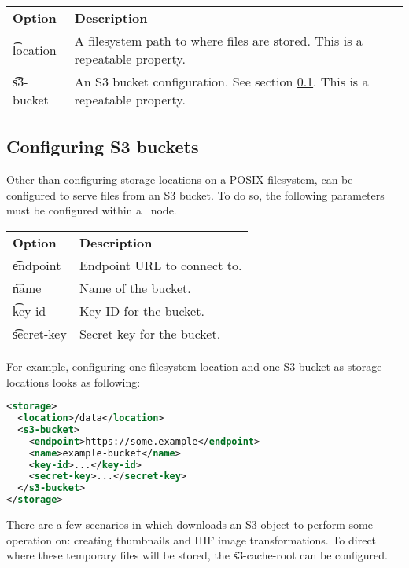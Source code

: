 \begin{tabularx}{\textwidth}{*{1}{!{\VRule[-1pt]}l}!{\VRule[-1pt]}X}
  \headrow
  \textbf{Option}            & \textbf{Description}\\
  \t{location}               & A filesystem path to where files are stored.
                               This is a repeatable property.\\
  \t{s3-bucket}              & An S3 bucket configuration. See section
                               \ref{sec:s3-buckets}. This is a repeatable
                               property.
\end{tabularx}

\subsection{Configuring S3 buckets}
\label{sec:s3-buckets}

  Other than configuring storage locations on a POSIX filesystem,
   can be configured to serve files from an S3 bucket.
  To do so, the following parameters must be configured within a\
   node.

\begin{tabularx}{\textwidth}{*{1}{!{\VRule[-1pt]}l}!{\VRule[-1pt]}X}
  \headrow
  \textbf{Option}             & \textbf{Description}\\
  \t{endpoint}                & Endpoint URL to connect to.\\
  \t{name}                    & Name of the bucket.\\
  \t{key-id}                  & Key ID for the bucket.\\
  \t{secret-key}              & Secret key for the bucket.
\end{tabularx}

  For example, configuring one filesystem location and one S3 bucket
  as storage locations looks as following:

\begin{lstlisting}[language=xml]
<storage>
  <location>/data</location>
  <s3-bucket>
    <endpoint>https://some.example</endpoint>
    <name>example-bucket</name>
    <key-id>...</key-id>
    <secret-key>...</secret-key>
  </s3-bucket>
</storage>
\end{lstlisting}

  There are a few scenarios in which  downloads an S3 object
  to perform some operation on: creating thumbnails and IIIF image
  transformations.  To direct where these temporary files will be stored,
  the \t{s3-cache-root} can be configured.


